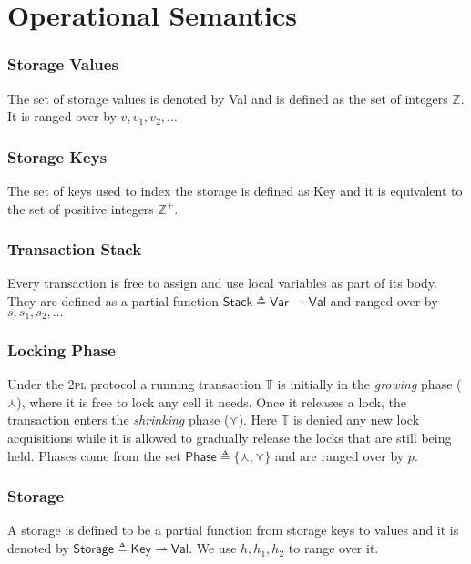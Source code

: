 \section{Operational Semantics}

\subsubsection{Storage Values}

The set of storage values is denoted by \textsf{Val} and is defined as the set of integers $\mathds{Z}$. It is ranged over by $v, v_1, v_2, \ldots$

\subsubsection{Storage Keys}

The set of keys used to index the storage is defined as \textsf{Key} and it is equivalent to the set of positive integers $\mathds{Z}^+$.

\subsubsection{Transaction Stack}

Every transaction is free to assign and use local variables as part of its body. They are defined as a partial function $\mathsf{Stack} \triangleq \mathsf{Var} \rightharpoonup \mathsf{Val}$ and ranged over by $s, s_1, s_2, \ldots$

\subsubsection{Locking Phase}

Under the \textsc{2pl} protocol a running transaction $\mathds{T}$ is initially in the \textit{growing} phase ($\curlywedge$), where it is free to lock any cell it needs. Once it releases a lock, the transaction enters the \textit{shrinking} phase ($\curlyvee$). Here $\mathds{T}$ is denied any new lock acquisitions while it is allowed to gradually release the locks that are still being held. Phases come from the set $\mathsf{Phase} \triangleq \{ \curlywedge, \curlyvee \}$ and are ranged over by $p$.

\subsubsection{Storage}

A storage is defined to be a partial function from storage keys to values and it is denoted by $\mathsf{Storage} \triangleq \mathsf{Key} \rightharpoonup \mathsf{Val}$. We use $h, h_1, h_2$ to range over it.

